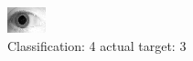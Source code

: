 \begin{figure}[h!]
\begin{center}
\includegraphics[width=0.60\columnwidth]{figures/ID1888_class_4_target_3.png}
\end{center}
\caption{ Classification: 4 actual target: 3}
\label{fig:ID1888_class_4_target_3}
\end{figure}
